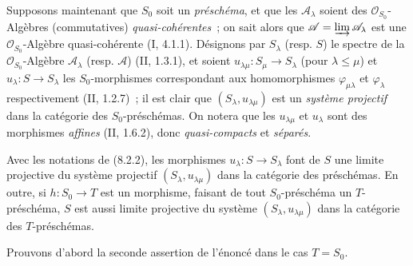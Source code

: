 \begin{env}[8.2.2]
\label{IV.8.2.2-fr}
Supposons maintenant que $S_0$ soit un \emph{préschéma}, et que les
$\mathscr A_\lambda$ soient des $\mathcal O_{S_0}$-Algèbres (commutatives)
\emph{quasi-cohérentes}~; on sait alors que
$\mathscr A=\varinjlim\mathscr A_\lambda$ est une
$\mathcal O_{S_0}$-Algèbre quasi-cohérente (I, 4.1.1). Désignons par
$S_\lambda$ (resp. $S$) le spectre de la $\mathcal O_{S_0}$-Algèbre
$\mathscr A_\lambda$ (resp. $\mathscr A$) (II, 1.3.1), et soient
$u_{\lambda\mu}:S_\mu\to S_\lambda$ (pour $\lambda\leq\mu$) et
$u_\lambda:S\to S_\lambda$ les $S_0$-morphismes correspondant aux
homomorphismes $\varphi_{\mu\lambda}$ et $\varphi_\lambda$ respectivement
(II, 1.2.7)~; il est clair que $(S_\lambda,u_{\lambda\mu})$ est un
\emph{système projectif} dans la catégorie des $S_0$-préschémas. On notera
que les $u_{\lambda\mu}$ et $u_\lambda$ sont des morphismes \emph{affines}
(II, 1.6.2), donc \emph{quasi-compacts} et \emph{séparés}.
\end{env}

\begin{proposition}[8.2.3]
\label{IV.8.2.3-fr}
Avec les notations de (8.2.2), les morphismes $u_\lambda:S\to S_\lambda$
font de $S$ une limite projective du système projectif
$(S_\lambda,u_{\lambda\mu})$ dans la catégorie des préschémas. En outre, si
$h:S_0\to T$ est un morphisme, faisant de tout $S_0$-préschéma un
$T$-préschéma, $S$ est aussi limite projective du système
$(S_\lambda,u_{\lambda\mu})$ dans la catégorie des $T$-préschémas.
\end{proposition}

Prouvons d'abord la seconde assertion de l'énoncé dans le cas $T=S_0$.
